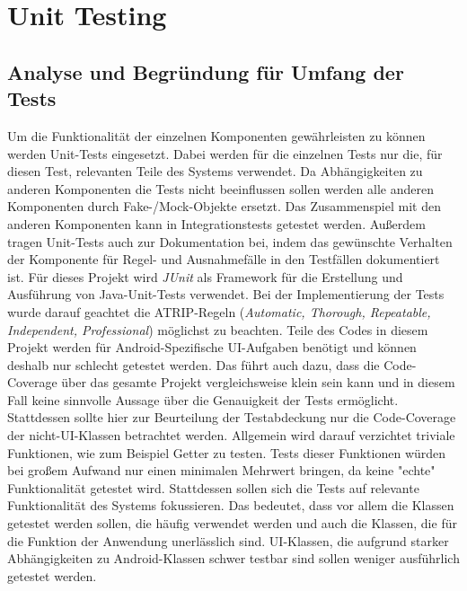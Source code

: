 \chapter{Unit Testing}

\section{Analyse und Begründung für Umfang der Tests}

Um die Funktionalität der einzelnen Komponenten gewährleisten zu können werden Unit-Tests eingesetzt.
Dabei werden für die einzelnen Tests nur die, für diesen Test, relevanten Teile des Systems verwendet.
Da Abhängigkeiten zu anderen Komponenten die Tests nicht beeinflussen sollen werden alle anderen Komponenten durch Fake-/Mock-Objekte ersetzt.
Das Zusammenspiel mit den anderen Komponenten kann in Integrationstests getestet werden.
Außerdem tragen Unit-Tests auch zur Dokumentation bei, indem das gewünschte Verhalten der Komponente für Regel- und Ausnahmefälle in den Testfällen dokumentiert ist.
\newline
Für dieses Projekt wird \textit{JUnit} als Framework für die Erstellung und Ausführung von Java-Unit-Tests verwendet.
Bei der Implementierung der Tests wurde darauf geachtet die ATRIP-Regeln (\textit{Automatic, Thorough, Repeatable, Independent, Professional}) möglichst zu beachten.
\newline
Teile des Codes in diesem Projekt werden für Android-Spezifische UI-Aufgaben benötigt und können deshalb nur schlecht getestet werden. Das führt auch dazu, dass die Code-Coverage über das gesamte Projekt vergleichsweise klein sein kann und in diesem Fall keine sinnvolle Aussage über die Genauigkeit der Tests ermöglicht.
Stattdessen sollte hier zur Beurteilung der Testabdeckung nur die Code-Coverage der nicht-UI-Klassen betrachtet werden.
\newline
Allgemein wird darauf verzichtet triviale Funktionen, wie zum Beispiel Getter zu testen.
Tests dieser Funktionen würden bei großem Aufwand nur einen minimalen Mehrwert bringen, da keine "echte" Funktionalität getestet wird.
Stattdessen sollen sich die Tests auf relevante Funktionalität des Systems fokussieren.
Das bedeutet, dass vor allem die Klassen getestet werden sollen, die häufig verwendet werden und auch die Klassen, die für die Funktion der Anwendung unerlässlich sind.
UI-Klassen, die aufgrund starker Abhängigkeiten zu Android-Klassen schwer testbar sind sollen weniger ausführlich getestet werden.
\newline
